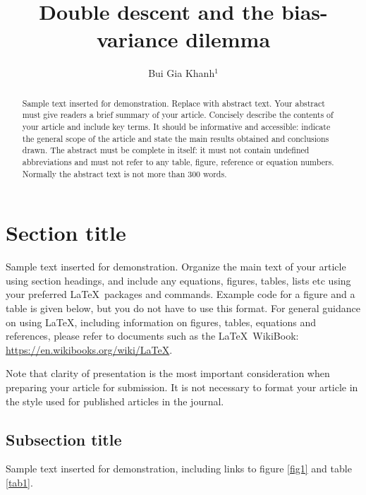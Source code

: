 \documentclass{iopjournal}
\begin{document}

\title{Double descent and the bias-variance dilemma}

\author{Bui Gia Khanh$^1$}






\begin{abstract}
Sample text inserted for demonstration. Replace with abstract text. Your abstract must give readers a brief summary of your article. Concisely describe the contents of your article and include key terms. It should be informative and accessible: indicate the general scope of the article and state the main results obtained and conclusions drawn. The abstract must be complete in itself: it must not contain undefined abbreviations and must not refer to any table, figure, reference or equation numbers. Normally the abstract text is not more than 300 words.
\end{abstract}

\section{Section title}
Sample text inserted for demonstration. Organize the main text of your article using section headings, and include any equations, figures, tables, lists etc using your preferred \LaTeX\ packages and commands. Example code for a figure and a table is given below, but you do not have to use this format. For general guidance on using \LaTeX , including information on figures, tables, equations and references, please refer to documents such as the \LaTeX\ WikiBook: \href{https://en.wikibooks.org/wiki/LaTeX}{https://en.wikibooks.org/wiki/LaTeX}.

Note that clarity of presentation is the most important consideration when preparing your article for submission. It is not necessary to format your article in the style used for published articles in the journal.

\subsection{Subsection title}
Sample text inserted for demonstration, including links to figure \ref{fig1} and table \ref{tab1}.
\end{document}

